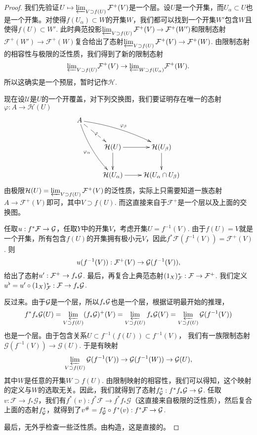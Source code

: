 \begin{proof}
	我们先验证$U\mapsto \varprojlim_{V\supset f(U)} \mathcal{F}^+(V)$是一个层。设$U$是一个开集，而$U_\alpha\subset U$也是一个开集。对使得$f(U_\alpha)\subset W$的开集$W$，我们都可以找到一个开集$W'$包含$W$且使得$f(U)\subset W'$. 此时典范投影$\varprojlim_{V\supset f(U)} \mathcal{F}^+(V)\to \mathcal{F}^+(W')$和限制态射$\mathcal{F}^+(W')\to \mathcal{F}^+(W)$复合给出了态射$\varprojlim_{V\supset f(U)} \mathcal{F}^+(V)\to \mathcal{F}^+(W)$. 由限制态射的相容性与极限的泛性质，我们得到了新的限制态射
	\[
	{\varprojlim}_{V\supset f(U)} \mathcal{F}^+(V)\to {\varprojlim}_{W\supset f(U_\alpha)} \mathcal{F}^+(W).
	\]
	所以这确实是一个预层，暂时记作$\mathcal{H}$.

	现在设$\mathscr{U}$是$U$的一个开覆盖，对下列交换图，我们要证明存在唯一的态射$\varphi:A\to \mathcal{H}(U)$
	\[
		\xymatrix{
			A\ar@/_/[ddr]_{\varphi_{\alpha}}\ar@/^/[drr]^{\varphi_{\beta}}\ar@{-->}[dr]|{\varphi}&& \\
			&\mathcal{H}(U)\ar[r]\ar[d]&\mathcal{H}(U_\beta)\ar[d]\\
			&\mathcal{H}(U_\alpha)\ar[r]&\mathcal{H}(U_{\alpha}\cap U_{\beta})
		}
	\]
	由极限$\mathcal{H}(U)=\varprojlim_{V\supset f(U)} \mathcal{F}^+(V)$的泛性质，实际上只需要知道一族态射$A\to \mathcal{F}^+(V)$即可，其中$V\supset f(U)$. 而这直接来自于$\mathcal{F}^+$是一个层以及上面的交换图。

	任取$u:f^*\mathcal{F}\to\mathcal{G}$，任取$Y$中的开集$V$，考虑开集$U=f^{-1}(V)$. 由于$f(U)=V$就是一个开集，所有包含$f(U)$的开集拥有极小元$V$，因此$f^*\mathcal{F}(f^{-1}(V))=\mathcal{F}^+(V)$.
	则
	\[
	u(f^{-1}(V)):\mathcal{F}^+(V)\to \mathcal{G}(f^{-1}(V)),
	\]
	给出了态射$u':\mathcal{F}^+\to f_*\mathcal{G}$. 最后，再复合上典范态射$(1_X)^*_{\mathcal{F}}:\mathcal{F} \to \mathcal{F}^+$. 我们定义$u^\flat=u'\circ (1_X)^*_{\mathcal{F}}: \mathcal{F}\to f_*\mathcal{G}$.

	反过来。由于$\mathcal{G}$是一个层，所以$f_*\mathcal{G}$也是一个层，根据证明最开始的推理，
	\[
		f^*f_*\mathcal{G}(U)=\varprojlim_{V\supset f(U)} (f_*\mathcal{G})^+(V)=\varprojlim_{V\supset f(U)} f_*\mathcal{G}(V)=\varprojlim_{V\supset f(U)} \mathcal{G}(f^{-1}(V))
	\]
	也是一个层。由于包含关系$U\subset f^{-1}(f(U))\subset f^{-1}(V)$，
	我们有一族限制态射$\mathcal{G}(f^{-1}(V))\to \mathcal{G}(U)$. 于是有映射
	\[
	\varprojlim_{V\supset f(U)} \mathcal{G}(f^{-1}(V))\to \mathcal{G}(f^{-1}(W))\to \mathcal{G}(U),
	\]
	其中$W$是任意的开集$W\supset f(U)$. 由限制映射的相容性，我们可以得知，这个映射的定义与$W$的选取无关。因此，我们就得到了态射$f^*_{\mathcal{G}}:f^*f_*\mathcal{G}\to \mathcal{G}$. 任取$v:\mathcal{F}\to f_*\mathcal{G}$，我们有$f^*(v):f^*\mathcal{F}\to f^*f_*\mathcal{G}$（这直接来自极限的泛性质），然后复合上面的态射$f^*_{\mathcal{G}}$，就得到了$v^\#=f^*_{\mathcal{G}}\circ f^*(v):f^*\mathcal{F}\to \mathcal{G}$.

	最后，无外乎检查一些泛性质。由构造，这是直接的。
\end{proof}

